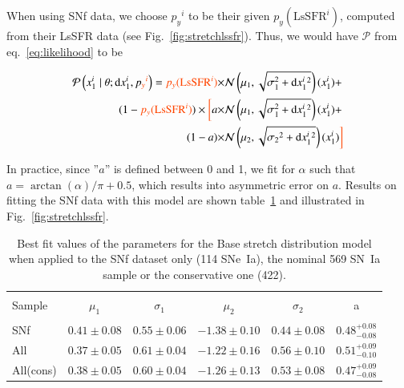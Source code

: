 \documentclass[]{aa} %
\newcommand{\mr}[1]{{\textcolor[rgb]{0.60,0.10,0.6}{#1}}}
\newcommand{\nn}[1]{{\textcolor[rgb]{1, 0.27, 0}{#1}}}
\newcommand{\prob}[2]{\mathcal{P}\left( #1 \mid #2\right)}
\begin{document}
\nn{When using SNf data, we choose $p_y{}^i$ to be their given
$p_y(\mathrm{LsSFR}^i)$, computed from their LsSFR data (see
Fig.~\ref{fig:stretchlssfr}). Thus, we would have $\mathcal{P}$ from
eq.~\ref{eq:likelihood} to be}

\begin{align}
    \label{eq:likelihoodsnf}
    \prob{x^{i}_{1}}{\theta; \mathrm{d}x^{i}_{1}, p\nn{_y{}^i}} =
    \nn{p_y(\mathrm{LsSFR}^i)} \times &\mathcal{N}\left(\mu_1,
    \sqrt{\sigma_{1}^{2}+\mathrm{d}x^{i}_{1}{}^{2}}\right)(x^{i}_{1}) +
    \nonumber\\
    (1-\nn{p_y(\mathrm{LsSFR}^i)}) \times \nn{\bigg[} a \times &
        \mathcal{N}\left(\mu_1,
        \sqrt{\sigma_{1}^{2}+\mathrm{d}x^{i}_{1}{}^{2}}\right)(x^{i}_{1}) +
        \nonumber\\
     (1-a) \times &\mathcal{N}\left(\mu_2,
 \sqrt{\sigma_2{}^{2}+\mathrm{d}x^{i}_{1}{}^{2}}\right)(x^{i}_{1}) \nn{\bigg]}
\end{align}

In practice, since ''$a$'' is defined between 0 and 1, we fit for $\alpha$ such
that $a=\arctan(\alpha)/\pi+0.5$, which results into asymmetric error on $a$.
\mr{Results on fitting the SNf data with this model are shown
table~\ref{tab:modelresults} and illustrated in Fig.~\ref{fig:stretchlssfr}.}

\begin{table}
    \centering
    \caption{Best fit values of the parameters for the Base stretch distribution
    model when applied to the SNf dataset only (114 SNe~Ia), the nominal 569
SN~Ia sample or the conservative one (422).}
    \label{tab:modelresults}
    \begin{tabular}{l c c c c c}
    \hline\hline\\[-0.8em]
        Sample & $\mu_1$  & $\sigma_1$ &$\mu_2$  & $\sigma_2$ & a \\[0.15em]
        \hline\\[-0.8em]
        SNf & $0.41 \pm 0.08$  & $0.55 \pm 0.06$ & $-1.38 \pm 0.10$ & $0.44 \pm 0.08$ & $0.48^{+0.08}_{-0.08}$ \\[0.15em]
        All & $0.37 \pm 0.05$  & $0.61 \pm 0.04$ & $-1.22 \pm 0.16$ & $0.56 \pm 0.10$ & $0.51^{+0.09}_{-0.10}$ \\[0.15em]
        All(cons) & $0.38 \pm 0.05$  & $0.60 \pm 0.04$ & $-1.26 \pm 0.13$ & $0.53 \pm 0.08$ & $0.47^{+0.09}_{-0.08}$ \\[0.15em]
        \hline
    \end{tabular}
\end{table}
\end{document}
